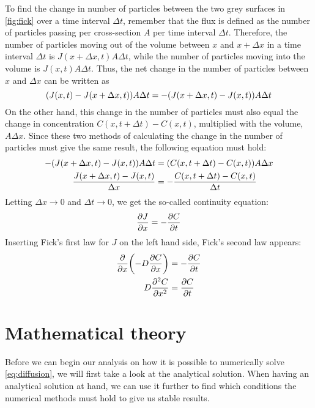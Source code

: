 \documentclass[12pt,english,a4paper]{article}
\begin{document}
To find the change in number of particles between the two grey surfaces in \vref{fig:fick} over a time interval \(\Delta t\), remember that the flux is defined as the number of particles passing per cross-section \(A\) per time interval \(\Delta t\). Therefore, the number of particles moving out of the volume between \(x\) and \(x+\Delta x\) in a time interval \(\Delta t\) is \(J(x+\Delta x,t)A\Delta t\), while the number of particles moving into the volume is \(J(x,t)A\Delta t\). Thus, the net change in the number of particles between \(x\) and \(\Delta x\) can be written as
\[
    \qty(J(x,t) - J(x + \Delta x,t))A\Delta t = -\qty(J(x+\Delta x,t) - J(x,t))A\Delta t
\]
On the other hand, this change in the number of particles must also equal the change in concentration \(C(x,t+\Delta t) - C(x,t)\), multiplied with the volume, \(A\Delta x\). Since these two methods of calculating the change in the number of particles must give the same result, the following equation must hold:
\begin{alignat*}{2}
    -\qty(J(x+\Delta x,t) - J(x,t))A\Delta t &= \qty(C(x,t+\Delta t) - C(x,t)) A\Delta x\\
    \frac{J(x+\Delta x,t) - J(x,t)}{\Delta x} &= -\frac{C(x,t+\Delta t) - C(x,t)}{\Delta t}
\end{alignat*}
Letting \(\Delta x\to0\) and \(\Delta t\to0\), we get the so-called continuity equation:
\[
    \pdv{J}{x} = -\pdv{C}{t}
\]
Inserting Fick's first law for \(J\) on the left hand side, Fick's second law appears:
\begin{alignat*}{2}
    \pdv{x}\qty(-D\pdv{C}{x}) &= -\pdv{C}{t}\\
    D\pdv[2]{C}{x} &= \pdv{C}{t}
\end{alignat*}


\section{Mathematical theory}
Before we can begin our analysis on how it is possible to numerically solve \vref{eq:diffusion}, we will first take a look at the analytical solution. When having an analytical solution at hand, we can use it further to find which conditions the numerical methods must hold to give us stable results.
\end{document}
